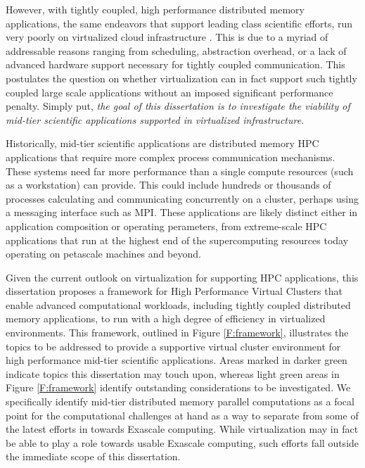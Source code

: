 However, with tightly coupled, high performance distributed memory applications, the same endeavors that support leading class scientific efforts, run very poorly on virtualized cloud infrastructure \cite{ostermann2009performance}.  This is due to a myriad of addressable reasons ranging from scheduling, abstraction overhead, or a lack of advanced hardware support necessary for tightly coupled communication. This postulates the question on whether virtualization can in fact support such tightly coupled large scale applications without an imposed significant performance penalty. Simply put, \emph{the goal of this dissertation is to investigate the viability of mid-tier scientific applications supported in virtualized infrastructure}.  

Historically, mid-tier scientific applications are distributed memory HPC applications that require more complex process communication mechanisms. These systems need far more performance than a single compute resources (such as a workstation) can provide. This could include hundreds or thousands of processes calculating and communicating concurrently on a cluster, perhaps using a messaging interface such as MPI.  These applications are likely distinct either in application composition or operating perameters, from extreme-scale HPC applications that run at the highest end of the supercomputing resources today operating on petascale machines and beyond.  




Given the current outlook on virtualization for supporting HPC applications, this dissertation proposes a framework for High Performance Virtual Clusters that enable advanced computational workloads, including tightly coupled distributed memory applications, to run with a high degree of efficiency  in virtualized environments. This framework, outlined in Figure \ref{F:framework}, illustrates the topics to be addressed to provide a supportive virtual cluster environment for high performance mid-tier scientific applications.  Areas marked in darker green indicate topics this dissertation may touch upon, whereas light green areas in Figure \ref{F:framework} identify outstanding considerations to be investigated. We specifically identify mid-tier distributed memory parallel computations as a focal point for the computational challenges at hand as a way to separate from some of the latest efforts in towards Exascale \cite{dongarra2011exascale, bergman2008exascale, shalf2010exascale} computing.  While virtualization may in fact be able to play a role towards usable Exascale computing, such efforts fall outside the immediate scope of this dissertation. 


